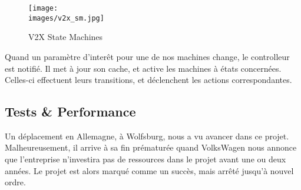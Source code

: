             \begin{figure}[ht]
                \centering
                \texttt{[image: \\images/v2x\_sm.jpg]}
                \caption{V2X State Machines}
                \label{v2x_sm}
            \end{figure}

            Quand un paramètre d'interêt pour une de nos machines change,
            le controlleur est notifié. Il met à jour son cache, et active
            les machines à états concernées. Celles-ci effectuent leurs
            transitions, et déclenchent les actions correspondantes.

    \subsection{Tests \& Performance}
        Un déplacement en Allemagne, à Wolfsburg, nous a vu avancer dans ce projet.
        Malheureusement, il arrive à sa fin prématurée quand VolksWagen nous
        annonce que l'entreprise n'investira pas de ressources dans le projet
        avant une ou deux années. Le projet est alors marqué comme un succès,
        mais arrêté jusqu'à nouvel ordre.
